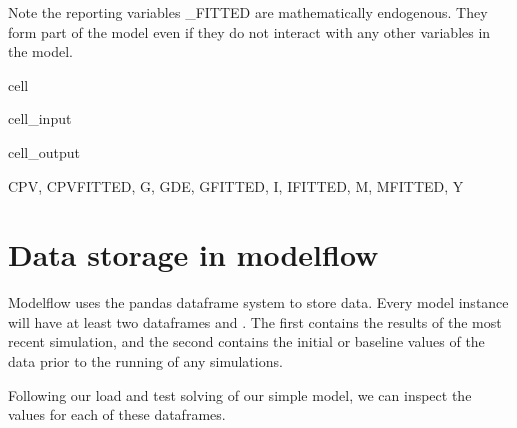 \documentclass[letterpaper,10pt,english]{jupyterBook}
\begin{document}
\sphinxAtStartPar
Note the reporting variables \_FITTED are mathematically endogenous. They form part of the model even if they do not interact with any other variables in the model.

\begin{sphinxuseclass}{cell}\begin{sphinxVerbatimInput}

\begin{sphinxuseclass}{cell_input}
\begin{sphinxVerbatim}[commandchars=\\\{\}]
\end{sphinxVerbatim}

\end{sphinxuseclass}\end{sphinxVerbatimInput}
\begin{sphinxVerbatimOutput}

\begin{sphinxuseclass}{cell_output}
\begin{sphinxVerbatim}[commandchars=\\\{\}]
\PYGZob{}\PYGZsq{}CPV\PYGZsq{},
 \PYGZsq{}CPV\PYGZus{}FITTED\PYGZsq{},
 \PYGZsq{}G\PYGZsq{},
 \PYGZsq{}GDE\PYGZsq{},
 \PYGZsq{}G\PYGZus{}FITTED\PYGZsq{},
 \PYGZsq{}I\PYGZsq{},
 \PYGZsq{}I\PYGZus{}FITTED\PYGZsq{},
 \PYGZsq{}M\PYGZsq{},
 \PYGZsq{}M\PYGZus{}FITTED\PYGZsq{},
 \PYGZsq{}Y\PYGZsq{}\PYGZcb{}
\end{sphinxVerbatim}

\end{sphinxuseclass}\end{sphinxVerbatimOutput}

\end{sphinxuseclass}

\section{Data storage in modelflow}
\label{\detokenize{content/05_SimpleModel/SimpleModel:data-storage-in-modelflow}}
\sphinxAtStartPar
Modelflow uses the pandas dataframe system to store data.  Every model instance will have at least two dataframes  and .  The first contains the results of the most recent simulation, and the second contains the initial or baseline values of the data prior to the running of any simulations.

\sphinxAtStartPar
Following our load and test solving of our simple model, we can inspect the values for each of these dataframes.
\end{document}
